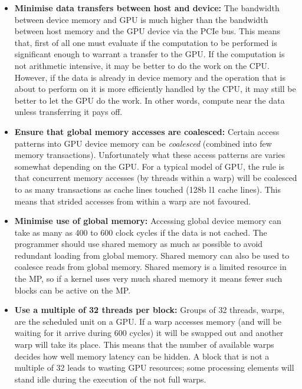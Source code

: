 \documentclass[a4paper]{book}
\begin{document}
\begin{itemize} 

\item {\bf Minimise data transfers between host and device:} The bandwidth between device memory 
and GPU is much higher than the bandwidth between host memory and the GPU device via the PCIe bus.
This means that, first of all one must evaluate if the computation to be performed is significant 
enough to warrant a transfer to the GPU. If the computation is not arithmetic intensive, it may be 
better to do the work on the CPU. However, if the data is already in device memory and 
the operation that is about to perform on it is more efficiently handled by the CPU, it may still 
be better to let the GPU do the work. In other words, compute near the data unless transferring it 
pays off. 

\item {\bf Ensure that global memory accesses are coalesced:} Certain access patterns into 
GPU device memory can be {\em coalesced} (combined into few memory transactions). Unfortunately 
what these access patterns are varies somewhat depending on the GPU. For a typical model of 
GPU, the rule is that concurrent memory accesses (by threads within a warp) will be coalesced 
to as many transactions as cache lines touched (128b l1 cache lines). This means that strided 
accesses from within a warp are not favoured. 

\item {\bf Minimise use of global memory:} Accessing global device memory can take as 
many as 400 to 600 clock cycles if the data is not cached. The programmer should 
use shared memory as much as possible to avoid redundant loading from global memory.
Shared memory can also be used to coalesce reads from global memory. Shared memory is 
a limited resource in the MP, so if a kernel uses very much shared memory it means 
fewer such blocks can be active on the MP. 

\item {\bf Use a multiple of 32 threads per block:} Groups of 32 threads, warps, are the 
scheduled unit on a GPU. If a warp accesses memory (and will be waiting for it arrive during 
600 cycles) it will be swapped out and another warp will take its place. This means that 
the number of available warps decides how well memory latency can be hidden. A block that is 
not a multiple of 32 leads to wasting GPU resources; some processing elements will stand 
idle during the execution of the not full warps. 


\end{itemize}
\end{document}
